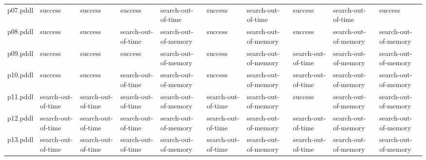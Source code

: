 \documentclass{article}
\begin{document}
\begin{tabular}{@{}lrrrrrrrrr@{}}
p07.pddl & \multicolumn{1}{|l|}{success} & \multicolumn{1}{|l|}{success} & \multicolumn{1}{|l|}{success} & \multicolumn{1}{|l|}{search-out-of-time} & \multicolumn{1}{|l|}{success} & \multicolumn{1}{|l|}{search-out-of-time} & \multicolumn{1}{|l|}{success} & \multicolumn{1}{|l|}{search-out-of-time} & \multicolumn{1}{|l|}{success} \\
p08.pddl & \multicolumn{1}{|l|}{success} & \multicolumn{1}{|l|}{success} & \multicolumn{1}{|l|}{search-out-of-time} & \multicolumn{1}{|l|}{search-out-of-memory} & \multicolumn{1}{|l|}{success} & \multicolumn{1}{|l|}{search-out-of-memory} & \multicolumn{1}{|l|}{success} & \multicolumn{1}{|l|}{search-out-of-memory} & \multicolumn{1}{|l|}{search-out-of-memory} \\
p09.pddl & \multicolumn{1}{|l|}{success} & \multicolumn{1}{|l|}{success} & \multicolumn{1}{|l|}{success} & \multicolumn{1}{|l|}{search-out-of-memory} & \multicolumn{1}{|l|}{success} & \multicolumn{1}{|l|}{search-out-of-memory} & \multicolumn{1}{|l|}{search-out-of-time} & \multicolumn{1}{|l|}{search-out-of-memory} & \multicolumn{1}{|l|}{search-out-of-memory} \\
p10.pddl & \multicolumn{1}{|l|}{success} & \multicolumn{1}{|l|}{success} & \multicolumn{1}{|l|}{search-out-of-time} & \multicolumn{1}{|l|}{search-out-of-memory} & \multicolumn{1}{|l|}{success} & \multicolumn{1}{|l|}{search-out-of-memory} & \multicolumn{1}{|l|}{search-out-of-time} & \multicolumn{1}{|l|}{search-out-of-memory} & \multicolumn{1}{|l|}{search-out-of-memory} \\
p11.pddl & \multicolumn{1}{|l|}{search-out-of-time} & \multicolumn{1}{|l|}{search-out-of-time} & \multicolumn{1}{|l|}{search-out-of-time} & \multicolumn{1}{|l|}{search-out-of-memory} & \multicolumn{1}{|l|}{search-out-of-time} & \multicolumn{1}{|l|}{search-out-of-memory} & \multicolumn{1}{|l|}{success} & \multicolumn{1}{|l|}{search-out-of-memory} & \multicolumn{1}{|l|}{search-out-of-memory} \\
p12.pddl & \multicolumn{1}{|l|}{search-out-of-time} & \multicolumn{1}{|l|}{search-out-of-time} & \multicolumn{1}{|l|}{search-out-of-time} & \multicolumn{1}{|l|}{search-out-of-memory} & \multicolumn{1}{|l|}{search-out-of-time} & \multicolumn{1}{|l|}{search-out-of-memory} & \multicolumn{1}{|l|}{search-out-of-time} & \multicolumn{1}{|l|}{search-out-of-memory} & \multicolumn{1}{|l|}{search-out-of-memory} \\
p13.pddl & \multicolumn{1}{|l|}{search-out-of-time} & \multicolumn{1}{|l|}{search-out-of-time} & \multicolumn{1}{|l|}{search-out-of-time} & \multicolumn{1}{|l|}{search-out-of-memory} & \multicolumn{1}{|l|}{search-out-of-time} & \multicolumn{1}{|l|}{search-out-of-memory} & \multicolumn{1}{|l|}{search-out-of-time} & \multicolumn{1}{|l|}{search-out-of-memory} & \multicolumn{1}{|l|}{search-out-of-memory} \\

\end{tabular}
\end{document}
